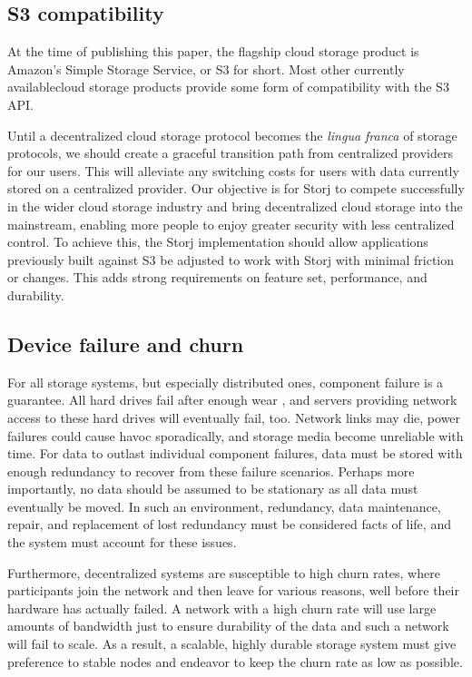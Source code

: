 \documentclass[a4paper,10pt]{article} \usepackage[utf8]{inputenc}
\begin{document}
\subsection{S3 compatibility}

At the time of publishing this paper, the flagship cloud storage product is
Amazon's Simple Storage Service, or S3 for
short. Most other currently availablecloud storage products provide some form
of compatibility with the S3 API.

Until a decentralized cloud storage protocol becomes the {\em lingua franca} of
storage protocols, we should create a graceful transition path from centralized
providers for our users.
This will alleviate any switching costs for users with data currently stored on
a centralized provider. Our objective is for Storj to compete successfully in
the wider cloud storage
industry and bring decentralized cloud storage into the mainstream, enabling
more people to enjoy greater security with less centralized control.
To achieve this, the Storj implementation should allow
applications previously built against S3 be adjusted to work with Storj with
minimal friction or changes.
This adds strong requirements on feature set, performance, and durability.

\subsection{Device failure and churn}

For all storage systems, but especially distributed ones, component
failure is a guarantee. All hard drives fail after enough wear
\cite{backblaze-hd-2018-q1}, and servers providing network access to
these hard drives will eventually fail, too. Network links may die, power
failures could cause havoc sporadically,
and storage media become unreliable with time.
For data to outlast individual component
failures, data must be stored with enough redundancy to recover from these
failure scenarios.
Perhaps more importantly, no data should be assumed to be stationary as all
data must eventually be moved. In such an environment, redundancy, data
maintenance, repair, and replacement of lost redundancy must be considered
facts of life, and the system must account for these issues.

Furthermore, decentralized systems are susceptible to high churn rates, where
participants join the network and then leave for various reasons, well
before their hardware has actually failed. A network with a high churn rate will
use large amounts of bandwidth just to ensure durability of the data and such
a network will fail to scale. As a result, a scalable, highly durable storage
system must give preference to stable nodes and endeavor to keep the churn rate
as low as possible.
\end{document}
